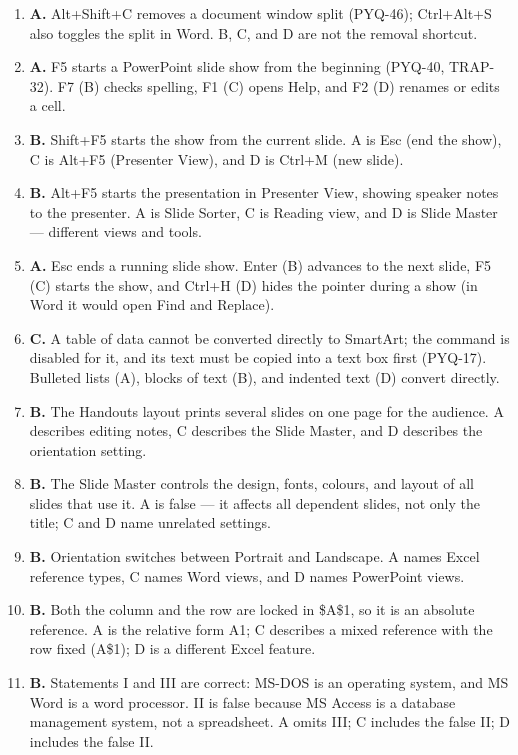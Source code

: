 \documentclass[11pt]{article}
\begin{document}
\begin{enumerate}[label=\textbf{Q\arabic*.}, leftmargin=*]
  Merge (PYQ-37, TRAP-29). Track Changes (A) records edits, AutoCorrect (B)
  fixes typing, and Find and Replace (D) substitutes text.
\item \textbf{A.} Alt+Shift+C removes a document window split (PYQ-46);
  Ctrl+Alt+S also toggles the split in Word. B, C, and D are not the removal
  shortcut.
\item \textbf{A.} F5 starts a PowerPoint slide show from the beginning
  (PYQ-40, TRAP-32). F7 (B) checks spelling, F1 (C) opens Help, and F2 (D)
  renames or edits a cell.
\item \textbf{B.} Shift+F5 starts the show from the current slide. A is Esc
  (end the show), C is Alt+F5 (Presenter View), and D is Ctrl+M (new slide).
\item \textbf{B.} Alt+F5 starts the presentation in Presenter View, showing
  speaker notes to the presenter. A is Slide Sorter, C is Reading view, and D
  is Slide Master --- different views and tools.
\item \textbf{A.} Esc ends a running slide show. Enter (B) advances to the next
  slide, F5 (C) starts the show, and Ctrl+H (D) hides the pointer during a
  show (in Word it would open Find and Replace).
\item \textbf{C.} A table of data cannot be converted directly to SmartArt; the
  command is disabled for it, and its text must be copied into a text box
  first (PYQ-17). Bulleted lists (A), blocks of text (B), and indented text
  (D) convert directly.
\item \textbf{B.} The Handouts layout prints several slides on one page for the
  audience. A describes editing notes, C describes the Slide Master, and D
  describes the orientation setting.
\item \textbf{B.} The Slide Master controls the design, fonts, colours, and
  layout of all slides that use it. A is false --- it affects all dependent
  slides, not only the title; C and D name unrelated settings.
\item \textbf{B.} Orientation switches between Portrait and Landscape. A names
  Excel reference types, C names Word views, and D names PowerPoint views.
\item \textbf{B.} Both the column and the row are locked in \$A\$1, so it is an
  absolute reference. A is the relative form A1; C describes a mixed reference
  with the row fixed (A\$1); D is a different Excel feature.
\item \textbf{B.} Statements I and III are correct: MS-DOS is an operating
  system, and MS Word is a word processor. II is false because MS Access is a
  database management system, not a spreadsheet. A omits III; C includes the
  false II; D includes the false II.


\end{enumerate}
\end{document}
